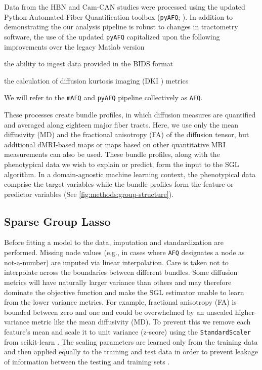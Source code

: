 \documentclass[10pt,letterpaper]{article}
\begin{document}
Data from the HBN and Cam-CAN studies were processed using the updated Python
Automated Fiber Quantification toolbox (\texttt{pyAFQ}; \cite{pyAFQ}). In
addition to demonstrating the our analysis pipeline is robust to changes in
tractometry software, the use of the updated \texttt{pyAFQ} capitalized upon
the following improvements over the legacy Matlab version
\begin{enumerate*}[%
    label=(\roman*),%
    before=\unskip{: },%
    itemjoin={{, }},%
    itemjoin*={{, and }}]
    \item the ability to ingest data provided in the BIDS format
    \cite{gorgolewski2016brain}
    \item the calculation of diffusion kurtosis imaging (DKI
    \cite{jensen2005diffusion}) metrics
\end{enumerate*}
We will refer to the \texttt{mAFQ} and \texttt{pyAFQ} pipeline collectively
as \texttt{AFQ}.

These processes create bundle profiles, in which diffusion measures
are quantified and averaged along eighteen major fiber tracts. Here,
we use only the mean diffusivity (MD) and the fractional anisotropy
(FA) of the diffusion tensor, but additional dMRI-based maps or maps
based on other quantitative MRI measurements can also be used. These
bundle profiles, along with the phenotypical data we wish to explain
or predict, form the input to the SGL algorithm. In a domain-agnostic
machine learning context, the phenotypical data comprise the target
variables while the bundle profiles form the feature or predictor
variables (See \cref{fig:methods:group-structure}).

\subsection*{Sparse Group Lasso}
\label{sec:sgl}

Before fitting a model to the data, imputation and standardization are
performed. Missing node values (e.g., in cases where \texttt{AFQ} designates
a node as not-a-number) are imputed via linear interpolation. Care is taken
not to interpolate across the boundaries between different bundles. Some
diffusion metrics will have naturally larger variance than others and may
therefore dominate the objective function and make the SGL estimator unable
to learn from the lower variance metrics. For example, fractional anisotropy
(FA) is bounded between zero and one and could be overwhelmed by an unscaled
higher-variance metric like the mean diffusivity (MD). To prevent this we
remove each feature's mean and scale it to unit variance (z-score) using the
\lstinline{StandardScaler} from scikit-learn \cite{scikit-learn}. The scaling
parameters are learned only from the training data and then applied equally
to the training and test data in order to prevent leakage of information
between the testing and training sets \cite{kaufman2012leakage}.
\end{document}
